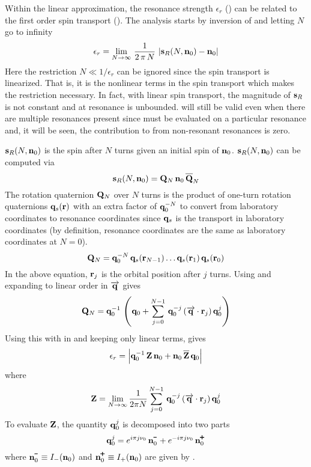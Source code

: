 Within the linear approximation, the resonance strength $\epsilon_r$ () can be related to
the first order spin transport (). The analysis starts by inversion of  and
letting $N$ go to infinity
\begin{equation}
  \epsilon_r = \lim_{N \rightarrow \infty} \, \frac{1}{2 \, \pi \, N} \, 
  \left| {\bf s}_R(N,{\bf n}_0) - {\bf n}_0 \right|
  \label{eN12n}
\end{equation}
Here the restriction $N \ll 1 / \epsilon_r$ can be ignored since the spin transport is linearized.
That is, it is the nonlinear terms in the spin transport which makes the restriction necessary. In
fact, with linear spin transport, the magnitude of ${\bf s}_R$ is not constant and at resonance is
unbounded.  will still be valid even when there are multiple resonances present since
 must be evaluated on a particular resonance and, it will be seen, the contribution to
 from non-resonant resonances is zero.

${\bf s}_R(N, {\bf n}_0)$ is the spin after $N$ turns given an initial spin of ${\bf n}_0$.  ${\bf s}_R(N,
{\bf n}_0)$ can be computed via
\begin{equation}
  \bfs_R(N, \bfn_0) = \bfQ_N \, \bfn_0 \, \BAR\bfQ_N
  \label{sQnQ}
\end{equation}
The rotation quaternion ${\bf Q}_N$ over $N$ turns is the product of one-turn rotation quaternions ${\bf q}_s({\bf r})$
with an extra factor of ${\bf q}_0^{-N}$ to convert from laboratory coordinates to resonance coordinates since
${\bf q}_s$ is the transport in laboratory coordinates (by definition, resonance coordinates are the same as 
laboratory coordinates at $N = 0$).
\begin{equation}
  {\bf Q}_N = {\bf q}_0^{-N} \, {\bf q}_s({\bf r}_{N-1}) \ldots {\bf q}_s({\bf r}_1) \, {\bf q}_s({\bf r}_0)
  \label{Qqqr}
\end{equation}
In the above equation, ${\bf r}_j$ is the orbital position after $j$ turns. 
Using  and expanding to linear order in $\overrightarrow{{\bf q}}$ gives
\begin{equation}
  {\bf Q}_N = {\bf q}_0^{-1} \, \left( 
  {\bf q}_0 + \sum_{j = 0}^{N-1} \, {\bf q}_0^{-j}
  \left( \overrightarrow{{\bf q}} \cdot {\bf r}_j \right) {\bf q}_0^{j}
  \right)
  \label{qqqjn}
\end{equation}
Using this with  in  and keeping only linear terms, gives
\begin{equation}
  \epsilon_r = \left|
    \bfq_0^{-1} \, \bfZ \, \bfn_0 + 
    \bfn_0 \, \BAR\bfZ \, \bfq_0
    \right| \label{eqZnn}
\end{equation}
where
\begin{equation}
  {\bf Z} = \lim_{N \rightarrow \infty} 
  \frac{1}{2 \pi N} 
  \sum_{j = 0}^{N-1} \, {\bf q}_0^{-j} \left( \overrightarrow{{\bf q}} \cdot {\bf r}_j \right) {\bf q}_0^{j}
  \label{Z}
\end{equation}
To evaluate ${\bf Z}$, the quantity ${\bf q}_0^j$ is decomposed into two parts
\begin{equation}
  \bfq_0^j = e^{i \pi j \nu_0} \, \bfn_0^\mmin + 
  e^{-i \pi j \nu_0} \, \bfn_0^\ppls
  \label{q12en}
\end{equation}
where $\bfn_0^\mmin \equiv I_-(\bfn_0)$ and $\bfn_0^\ppls \equiv I_+(\bfn_0)$ are given by .


